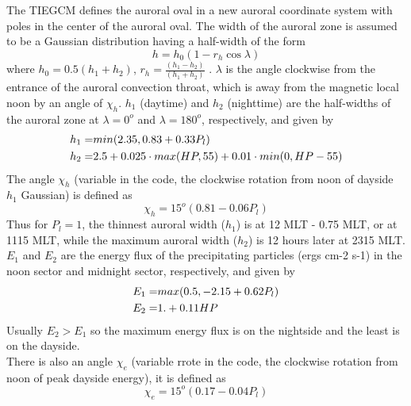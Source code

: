 %
The TIEGCM defines the auroral oval in a new auroral coordinate 
system with poles in the center of the auroral oval. The width of 
the auroral zone is assumed to be a Gaussian distribution having 
a half-width of the form
%
\begin{equation}
   h = h_0 (1-r_h \cos \lambda )
    \label{eq:aurora_1}
\end{equation}
% 
where $h_0 = 0.5(h_1 + h_2)$, $r_h = \frac{(h_1 - h_2)}{(h_1+h_2)}$ . $\lambda$ is the angle 
clockwise from the entrance of the auroral convection 
throat, which is away from the magnetic local noon by 
an angle of $\chi_h$. $h_1$ (daytime) and $h_2$ (nighttime) are the 
half-widths of the auroral zone at $\lambda = 0^o$ and  $\lambda = 180^o$, respectively, 
and given by
%
\begin{equation}
  \begin{split}
   h_1 =& min(2.35, 0.83 + 0.33 P_l) \notag \\
   h_2 =& 2.5 + 0.025 \cdot max (HP, 55) + 0.01 \cdot min(0,HP-55)
   \end{split}
    \label{eq:aurora_2}
\end{equation}
% 
The angle  $\chi_h$ (variable  in the code, the clockwise 
rotation from noon of dayside $h_1$ Gaussian) is defined as
%
\begin{equation}
   \chi_h = 15^o (0.81 - 0.06 P_l)
    \label{eq:aurora_3}
\end{equation}
% 
Thus for $P_l = 1$, the thinnest
auroral width ($h_1$) is at 12 MLT - 0.75 MLT, or at 1115 MLT, while the
maximum auroral width ($h_2$) is 12 hours later at 2315 MLT. \\
% 
$E_1$ and $E_2$ 
are the energy flux of the precipitating particles (ergs cm-2 s-1) 
in the noon sector and midnight sector, respectively, and given by
%
\begin{equation}
  \begin{split}
    E_1 = & max(0.5, -2.15+0.62 P_l) \notag \\
    E_2 = & 1. + 0.11 HP 
    \label{eq:aurora_8}
  \end{split}
\end{equation}
%
Usually $E_2 > E_1$ so the maximum energy flux is on the nightside and the least
is on the dayside.\\
%
There is also an angle $\chi_e$ (variable rrote in the code, 
the clockwise rotation from noon of peak dayside energy), 
it is defined as
%
\begin{equation}
   \chi_e = 15^o (0.17 - 0.04 P_l)
    \label{eq:aurora_4}
\end{equation}
